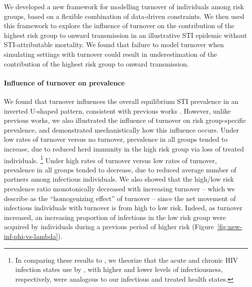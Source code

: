 We developed a new framework for modelling turnover of individuals among risk groups,
based on a flexible combination of data-driven constraints.
We then used this framework to explore the influence of turnover on
the contribution of the highest risk group to onward transmission in an
illustrative STI epidemic without STI-attributable mortality.
We found that failure to model turnover when simulating settings with turnover
could result in underestimation of
the contribution of the highest risk group to onward transmission.
\paragraph{Influence of turnover on prevalence}
We found that turnover influences the overall equilibrium STI prevalence
in an inverted U-shaped pattern, consistent with previous works
\citep{Stigum1994,Zhang2012,Henry2015}.
However, unlike previous works, we also illustrated the influence of turnover on
risk group-specific prevalence, and demonstrated mechanistically how this influence occurs.
Under low rates of turnover versus no turnover,
prevalence in all groups tended to increase, due to
reduced herd immunity in the high risk group
via loss of treated individuals.%
\footnote{
  In comparing these results to \citep{Zhang2012},
  we theorize that the acute and chronic HIV infection states use by \citeauthor{Zhang2012},
  with higher and lower levels of infectiousness, respectively,
  were analogous to our infectious and treated health states.}
Under high rates of turnover versus low rates of turnover,
prevalence in all groups tended to decrease, due to
reduced average number of partners among infectious individuals.
We also showed that the high/low risk prevalence ratio
monotonically decreased with increasing turnover
-- which we describe as the ``homogenizing effect'' of turnover --
since the net movement of infectious individuals with turnover is
from high to low risk.
Indeed, as turnover increased,
an increasing proportion of infections in the low risk group
were acquired by individuals during a previous period of higher risk
(Figure~\ref{fig:new-inf-phi-vs-lambda}).
